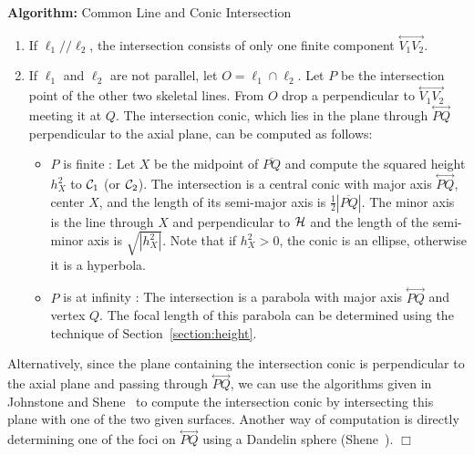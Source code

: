 \begin{center}
\begin{minipage}{5in}
\vspace{8mm}
\begin{center}
     {\bf Algorithm:} Common Line and Conic Intersection
\end{center}
{\small
\begin{enumerate}
     \item If $\ell_1//\ell_2$, the intersection consists of only one finite
          component $\stackrel{\longleftrightarrow}{V_1V_2}$.
     \item If $\ell_1$ and $\ell_2$ are not parallel, let $O=\ell_1\cap\ell_2$.
        Let $P$ be the intersection point of the other two skeletal lines.
          From $O$ drop a perpendicular
          to $\stackrel{\longleftrightarrow}{V_1V_2}$ meeting it at $Q$.
       The intersection conic, which lies in the plane through
       $\stackrel{\longleftrightarrow}{PQ}$ perpendicular to the axial
       plane, can be computed as follows:
     \begin{itemize}
          \item $P$ is finite :  Let $X$ be the midpoint of $\overline{PQ}$
               and compute the squared height $h_X^2$ to ${\cal C}_1$
               (or ${\cal C}_2$).  The intersection is a central conic with
               major axis $\stackrel{\longleftrightarrow}{PQ}$, center $X$,
            and the length of its semi-major axis is
               $\frac{1}{2}|\overline{PQ}|$.
               The minor axis is the line through $X$ and perpendicular to
               ${\cal H}$ and the length of the semi-minor axis is
            $\sqrt{|h_X^2|}$.  Note that if
               $h_X^2>0$, the conic is an ellipse, otherwise it is a hyperbola.
          \item $P$ is at infinity : The intersection
            is a parabola with major axis
               $\stackrel{\longleftrightarrow}{PQ}$ and vertex $Q$.  The focal
               length of this parabola can be determined using the technique
               of Section~\ref{section:height}.
     \end{itemize}
\end{enumerate}
}
\end{minipage}
\end{center}

\begin{remark}\rm
     Alternatively, since the plane containing the intersection conic is
perpendicular to the axial plane and passing  through
$\stackrel{\longleftrightarrow}{PQ}$, we can use the algorithms given
in Johnstone and Shene~\cite{johnstone-shene:1991} to compute the intersection
conic by intersecting this plane with one of the two given surfaces.
Another way of computation is directly determining one of the foci on
$\stackrel{\longleftrightarrow}{PQ}$ using a Dandelin sphere
(Shene~\cite{shene:1992}).  $\Box$
\end{remark}



